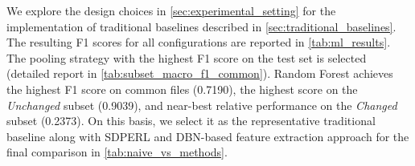\documentclass[authoryear,final,5p,times,twocolumn]{elsarticle}
\theoremstyle{plain}
\begin{document}
\begin{table}[!htbp]
\centering
\caption{Performance of the naive label-persistent classifier.}
\label{tab:naive_baseline}
\small
\setlength{\tabcolsep}{3pt}
\renewcommand{\arraystretch}{1.15}
\end{table}

We explore the design choices in \autoref{sec:experimental_setting} for the implementation of traditional baselines described in \autoref{sec:traditional_baselines}.
The resulting F1 scores for all configurations are reported in \autoref{tab:ml_results}. The pooling strategy with the highest F1 score on the test set is selected (detailed report in \autoref{tab:subset_macro_f1_common}). Random Forest achieves the highest F1 score on common files (0.7190), the highest score on the \textit{Unchanged} subset (0.9039), and near-best relative performance on the \textit{Changed} subset (0.2373). On this basis, we select it as the representative traditional baseline along with SDPERL \citep{hesamolhokama2024sdperl} and DBN-based feature extraction approach \citep{wang2018deep} for the final comparison in \autoref{tab:naive_vs_methods}.
\end{document}

